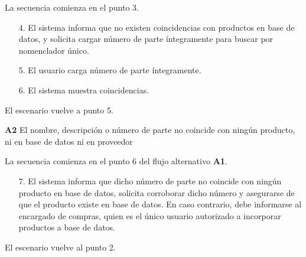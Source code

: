 La secuencia comienza en el punto 3.

\begin{enumerate}
	\item[4.] El sistema informa que no existen coincidencias con productos en base de datos,
	y solicita cargar número de parte íntegramente para buscar por nomenclador único.
	\item[5.] El usuario carga número de parte íntegramente.
	\item[6.] El sistema muestra coincidencias.
\end{enumerate}

El escenario vuelve a punto 5.

\textbf{A2} El nombre, descripción o número de parte no coincide con ningún producto, ni en base de datos ni en proveedor

La secuencia comienza en el punto 6 del flujo alternativo \textbf{A1}.

\begin{enumerate}
	\item [7.] El sistema informa que dicho número de parte no coincide con ningún producto en base de datos,
	solicita corroborar dicho número y asegurarse de que el producto existe en base de datos.
	En caso contrario, debe informarse al encargado de compras, quien es el único usuario autorizado a incorporar productos a base de datos.
\end{enumerate}

El escenario vuelve al punto 2.

